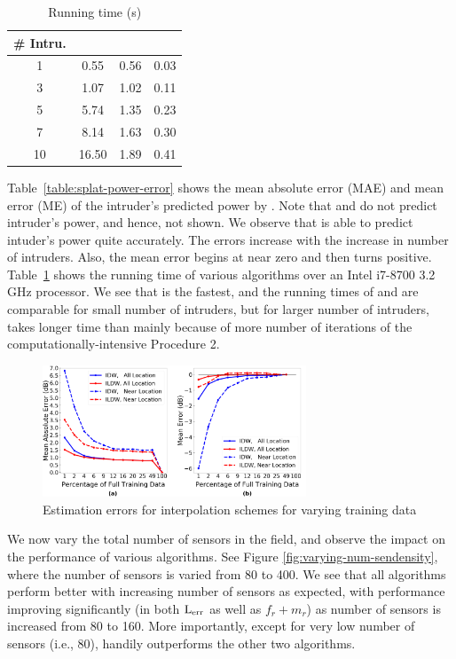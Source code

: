 \begin{table}
	\caption{Running time (s)}
	\centering
	\begin{tabular}{c c c c}
		\hline\hline
		\# Intru. & \ouralgo & \splot & \cl \\
		\hline
		1 &  0.55 & 0.56 & 0.03\\ 
		3 &  1.07 & 1.02 & 0.11  \\
		5 &  5.74 & 1.35 & 0.23 \\
		7 &  8.14 & 1.63 & 0.30 \\
		10 & 16.50 & 1.89 & 0.41  \\
		\hline
	\end{tabular}
	\label{table:splat-running-time}	
\end{table}


Table~\ref{table:splat-power-error} shows the mean absolute error
(MAE) and mean error (ME) of the intruder's predicted power by
\ouralgo. Note that \cl and \splot do not predict intruder's power,
and hence, not shown. We observe that \ouralgo is able to predict
intuder's power quite accurately. The errors increase with the increase in number of intruders. Also, the mean error begins at near zero and then turns positive. 
Table~\ref{table:splat-running-time} shows the running time of various
algorithms over an Intel i7-8700 3.2 GHz processor. We see that \cl is
the fastest, and the running times of \ouralgo and \splot are
comparable for small number of intruders, but for larger number of
intruders, \ouralgo takes longer time than \splot mainly because of
more number of iterations of the computationally-intensive Procedure
2.

\begin{figure}[ht]
	\centering
	\includegraphics[width=0.7\textwidth]{chapters/ipsn/figures/inter_error.png}
	\caption{Estimation errors for interpolation schemes for varying training data}
	\label{fig:inter-error}
\end{figure}

 We now vary the total number of sensors
in the field, and observe the impact on the performance of various
algorithms. See Figure \ref{fig:varying-num-sendensity}, where the
number of sensors is varied from 80 to 400. We see that all algorithms
perform better with increasing number of sensors as expected, with
\ouralgo performance improving significantly (in both $\mathrm{L_{err}}$ as well
as $f_r + m_r$) as number of sensors is increased from 80 to 160. More
importantly, except for very low number of sensors (i.e., 80),
\ouralgo handily outperforms the other two algorithms.


